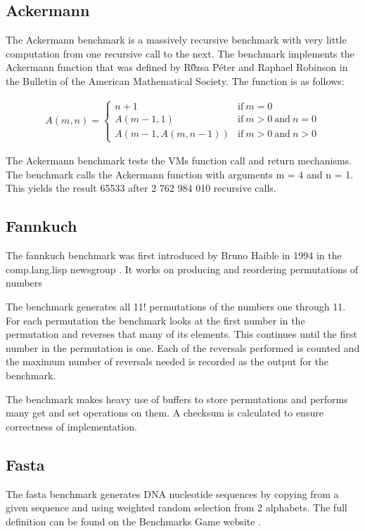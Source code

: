\documentclass[english,a4paper,12pt]{report}
\begin{document}
\subsection{Ackermann}

The Ackermann benchmark is a massively recursive benchmark with very
little computation from one recursive call to the next. The benchmark
implements the Ackermann function that was defined by R\'{0}zsa P\'{e}ter and
Raphael Robinson \cite{robinson1948} in the Bulletin of the American
Mathematical Society. The function is as follows:

\begin{align*}
\label{eq:ackermann}
A (m, n) = \left\{
\begin{array}{ll}
n + 1          &  \mathrm{if}\ m = 0 \\
A (m - 1, 1)   &  \mathrm{if }\ m > 0 \mathrm{\ and\ } n = 0 \\
A (m - 1, A (m, n - 1))   & \mathrm{if}\ m > 0 \mathrm{\  and\  } n > 0 
\end{array}
\right.
\end{align*}

The Ackermann benchmark tests the VMs function call and return
mechanisms. The benchmark calls the Ackermann function with arguments
m = 4 and n = 1. This yields the result 65533 after 2 762 984 010
recursive calls.

\subsection{Fannkuch}

The fannkuch benchmark was first introduced by Bruno Haible in 1994 in
the comp.lang.lisp newsgroup \cite{fannkuch}. It works on producing
and reordering permutations of numbers

The benchmark generates all 11! permutations of the numbers one
through 11. For each permutation the benchmark looks at the first
number in the permutation and reverses that many of its elements. This
continues until the first number in the permutation is one. Each of
the reversals performed is counted and the maximum number of reversals
needed is recorded as the output for the benchmark.

The benchmark makes heavy use of buffers to store permutations and
performs many get and set operations on them. A checksum is calculated
to ensure correctness of implementation.

\subsection{Fasta}
The fasta benchmark generates DNA nucleotide sequences by copying from
a given sequence and using weighted random selection from 2
alphabets. The full definition can be found on the Benchmarks Game
website \cite{fasta}.
\end{document}
